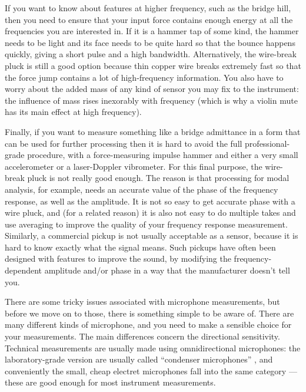   If you want to know about features at higher frequency, such as the bridge 
  hill, then you need to ensure that your input force contains enough energy at 
  all the frequencies you are interested in. If it is a hammer tap of some 
  kind, the hammer needs to be light and its face needs to be quite hard so 
  that the bounce happens quickly, giving a short pulse and a high bandwidth. 
  Alternatively, the wire-break pluck is still a good option because thin 
  copper wire breaks extremely fast so that the force jump contains a lot of 
  high-frequency information. You also have to worry about the added mass of 
  any kind of sensor you may fix to the instrument: the influence of mass rises 
  inexorably with frequency (which is why a violin mute has its main effect at 
  high frequency). 

  Finally, if you want to measure something like a bridge admittance in a form 
  that can be used for further processing then it is hard to avoid the full 
  professional-grade procedure, with a force-measuring impulse hammer and 
  either a very small accelerometer or a laser-Doppler vibrometer. For this 
  final purpose, the wire-break pluck is not really good enough. The reason is 
  that processing for modal analysis, for example, needs an accurate value of 
  the phase of the frequency response, as well as the amplitude. It is not so 
  easy to get accurate phase with a wire pluck, and (for a related reason) it 
  is also not easy to do multiple takes and use averaging to improve the 
  quality of your frequency response measurement. Similarly, a commercial 
  pickup is not usually acceptable as a sensor, because it is hard to know 
  exactly what the signal means. Such pickups have often been designed with 
  features to improve the sound, by modifying the frequency-dependent amplitude 
  and/or phase in a way that the manufacturer doesn't tell you. 


  There are some tricky issues associated with microphone measurements, but 
  before we move on to those, there is something simple to be aware of. There 
  are many different kinds of microphone, and you need to make a sensible 
  choice for your measurements. The main differences concern the directional 
  sensitivity. Technical measurements are usually made using omnidirectional 
  microphones: the laboratory-grade version are usually called ``condenser 
  microphones'' , and conveniently the small, cheap electret microphones fall 
  into the same category --- these are good enough for most instrument 
  measurements. 

